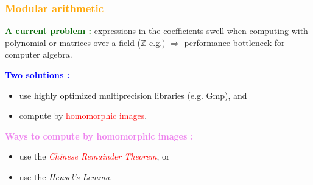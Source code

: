 \begin{frame}[fragile]
\frametitle{\textbf{\textcolor{orange}{Modular arithmetic}}}

\begin{block}{}
\textcolor{darkgreen}{\textbf{A current problem :}} expressions in the coefficients swell when computing with polynomial or matrices over a field ($\mathbb{Z}$ e.g.) $\Rightarrow$ performance bottleneck for computer algebra.\\
\end{block}
\vline

\begin{block}{}
\textcolor{blue}{\textbf{Two solutions :}}
\begin{itemize}
\item use highly optimized multiprecision libraries (e.g. {\sc Gmp}), and
\item compute by \textcolor{red}{homomorphic images}.
\end{itemize}
\end{block}

\begin{block}{}
\textcolor{violet}{\textbf{Ways to compute by homomorphic images :}}
\begin{itemize}
\item use the \textcolor{red}{\textit{Chinese Remainder Theorem}}, or
\item use the \textit{Hensel's Lemma}.
\end{itemize}
\end{block}

\end{frame}

